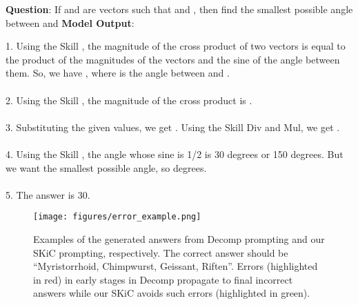\documentclass{article} \usepackage{arxiv}
\begin{document}
\begin{tcolorbox}[title = {MATH}, colback = Apricot!25!white, colframe = BrickRed!75!black] 
\textbf{Question}: If  and  are vectors such that   and , then find the smallest possible angle between  and  
\tcblower
\textbf{Model Output}:


\quad


1. Using the Skill , the magnitude of the cross product of two vectors is equal to the  product of the magnitudes of the vectors and the sine of the angle between them. So, we have  , where  is the angle between  and . \\ \\
2. Using the Skill , the magnitude of the cross product  is . \\ \\
3. Substituting the given values, we get . Using the Skill Div and Mul, we get . \\ \\
4. Using the Skill , the angle whose sine is 1/2 is 30 degrees or 150 degrees. But we want the smallest possible angle, so  degrees. \\ \\
5. The answer is 30. 
\end{tcolorbox}
\noindent\begin{minipage}{\textwidth}
 \label{Tab:example_compose_math_skill_4}
\end{minipage}




\newpage









\begin{figure*}[ht]
\vskip 0.2in
\begin{center}
\centerline{\texttt{[image: figures/error\_example.png]}}
\caption{Examples of the generated answers from Decomp prompting and our SKiC prompting, respectively. The correct answer should be ``Myristorrhoid, Chimpwurst, Geissant, Riften''. Errors (highlighted in red) in early stages in Decomp propagate to final incorrect answers while our SKiC avoids such errors (highlighted in green).} 
\label{fig:error_example}
\end{center}
\vskip -0.2in
\end{figure*}
\end{document}
